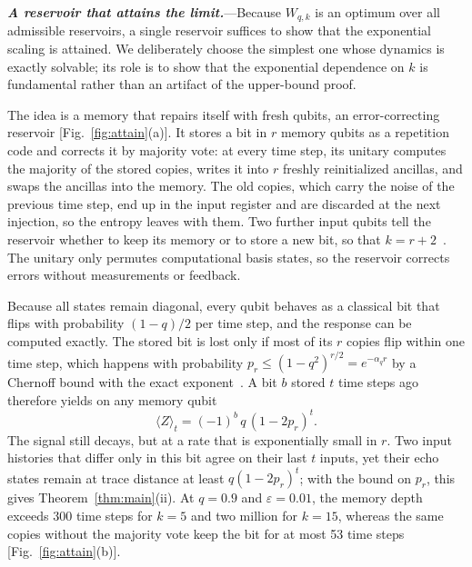 \documentclass[aps,prl,twocolumn,superscriptaddress,floatfix]{revtex4-2}
\theoremstyle{plain}
\newcommand{\runin}[1]{\textit{\textbf{#1}}---}
\begin{document}
\runin{A reservoir that attains the limit.}Because $W_{q,k}$ is an optimum over all admissible reservoirs, a single reservoir suffices to show that the exponential scaling is attained. We deliberately choose the simplest one whose dynamics is exactly solvable; its role is to show that the exponential dependence on $k$ is fundamental rather than an artifact of the upper-bound proof.

The idea is a memory that repairs itself with fresh qubits, an error-correcting reservoir [Fig.~\ref{fig:attain}(a)]. It stores a bit in $r$ memory qubits as a repetition code and corrects it by majority vote: at every time step, its unitary computes the majority of the stored copies, writes it into $r$ freshly reinitialized ancillas, and swaps the ancillas into the memory. The old copies, which carry the noise of the previous time step, end up in the input register and are discarded at the next injection, so the entropy leaves with them. Two further input qubits tell the reservoir whether to keep its memory or to store a new bit, so that $k=r+2$~\cite{SM}. The unitary only permutes computational basis states, so the reservoir corrects errors without measurements or feedback.

Because all states remain diagonal, every qubit behaves as a classical bit that flips with probability $(1-q)/2$ per time step, and the response can be computed exactly. The stored bit is lost only if most of its $r$ copies flip within one time step, which happens with probability $p_r\le(1-q^2)^{r/2}=e^{-\alpha_qr}$ by a Chernoff bound with the exact exponent~\cite{SM}. A bit $b$ stored $t$ time steps ago therefore yields on any memory qubit
\begin{equation}
\langle Z\rangle_t=(-1)^b\,q\,(1-2p_r)^t .
\label{eq:response}
\end{equation}
The signal still decays, but at a rate that is exponentially small in $r$. Two input histories that differ only in this bit agree on their last $t$ inputs, yet their echo states remain at trace distance at least $q(1-2p_r)^t$; with the bound on $p_r$, this gives Theorem~\ref{thm:main}(ii). At $q=0.9$ and $\varepsilon=0.01$, the memory depth exceeds 300 time steps for $k=5$ and two million for $k=15$, whereas the same copies without the majority vote keep the bit for at most 53 time steps [Fig.~\ref{fig:attain}(b)].
\end{document}

